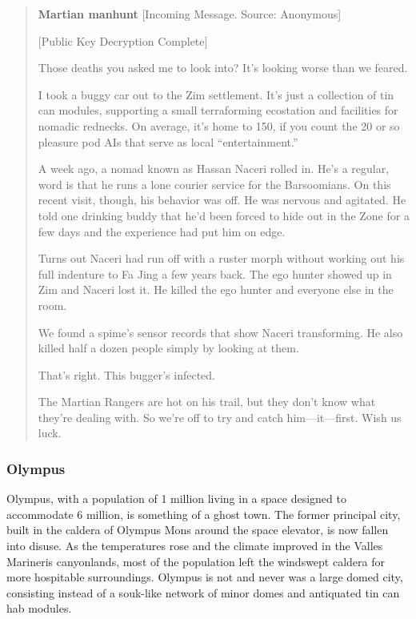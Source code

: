 \begin{quotation} \textbf{Martian manhunt} [Incoming Message. Source: Anonymous] 

[Public Key Decryption Complete] 

Those deaths you asked me to look into? It’s looking worse than we feared. 

I took a buggy car out to the Zim settlement. It’s just a collection of tin can modules, supporting a small terraforming ecostation and facilities for nomadic rednecks. On average, it’s home to 150, if you count the 20 or so pleasure pod AIs that serve as local “entertainment.” 

A week ago, a nomad known as Hassan Naceri rolled in. He’s a regular, word is that he runs a lone courier service for the Barsoomians. On this recent visit, though, his behavior was off. He was nervous and agitated. He told one drinking buddy that he’d been forced to hide out in the Zone for a few days and the experience had put him on edge. 

Turns out Naceri had run off with a ruster morph without working out his full indenture to Fa Jing a few years back. The ego hunter showed up in Zim and Naceri lost it. He killed the ego hunter and everyone else in the room. 

We found a spime’s sensor records that show Naceri transforming. He also killed half a dozen people simply by looking at them. 

That’s right. This bugger’s infected. 

The Martian Rangers are hot on his trail, but they don’t know what they’re dealing with. So we’re off to try and catch him—it—first. Wish us luck. \end{quotation} 

\subsubsection{Olympus} \label{sec:olympus} 

Olympus, with a population of 1 million living in a space designed to accommodate 6 million, is something of a ghost town. The former principal city, built in the caldera of Olympus Mons around the space elevator, is now fallen into disuse. As the temperatures rose and the climate improved in the Valles Marineris canyonlands, most of the population left the windswept caldera for more hospitable surroundings. Olympus is not and never was a large domed city, consisting instead of a souk-like network of minor domes and antiquated tin can hab modules. 

